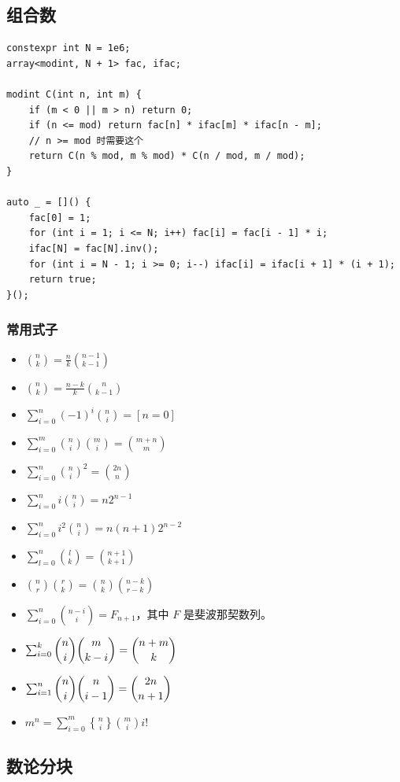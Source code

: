 \documentclass[UTF8, twoside]{ctexart}
\begin{document}
\begin{sloppypar}
\subsection{组合数}

\begin{lstlisting}[style=cpp]
constexpr int N = 1e6;
array<modint, N + 1> fac, ifac;

modint C(int n, int m) {
    if (m < 0 || m > n) return 0;
    if (n <= mod) return fac[n] * ifac[m] * ifac[n - m];
    // n >= mod 时需要这个
    return C(n % mod, m % mod) * C(n / mod, m / mod);
}

auto _ = []() {
    fac[0] = 1;
    for (int i = 1; i <= N; i++) fac[i] = fac[i - 1] * i;
    ifac[N] = fac[N].inv();
    for (int i = N - 1; i >= 0; i--) ifac[i] = ifac[i + 1] * (i + 1);
    return true;
}();
\end{lstlisting}

\subsubsection{常用式子}

\begin{itemize}
   \item $\binom{n}{k} = \frac{n}{k} \binom{n-1}{k-1}$
   \item $\binom{n}{k} = \frac{n-k}{k} \binom{n}{k-1}$
   \item $\sum_{i=0}^n(-1)^i\binom{n}{i}=[n=0]$
   \item $\sum_{i=0}^m \binom{n}{i}\binom{m}{i} = \binom{m+n}{m}$
   \item $\sum_{i=0}^n\binom{n}{i}^2=\binom{2n}{n}$
   \item $\sum_{i=0}^ni\binom{n}{i}=n2^{n-1}$
   \item $\sum_{i=0}^ni^2\binom{n}{i}=n(n+1)2^{n-2}$
   \item $\sum_{l=0}^n\binom{l}{k} = \binom{n+1}{k+1}$
   \item $\binom{n}{r}\binom{r}{k} = \binom{n}{k}\binom{n-k}{r-k}$
   \item $\sum_{i=0}^n\binom{n-i}{i}=F_{n+1}$，其中 $F$ 是斐波那契数列。
   \item $\sum_{i=0}^k\dbinom{n}{i}\dbinom{m}{k-i}=\dbinom{n+m}{k}$
   \item $\sum_{i=1}^{n}\dbinom{n}{i}\dbinom{n}{i-1}=\dbinom{2n}{n+1}$
   \item $m^n = \sum_{i=0}^{m}{n \brace i}\binom{m}{i}i!$
\end{itemize}

\subsection{数论分块}


\end{sloppypar}
\end{document}
